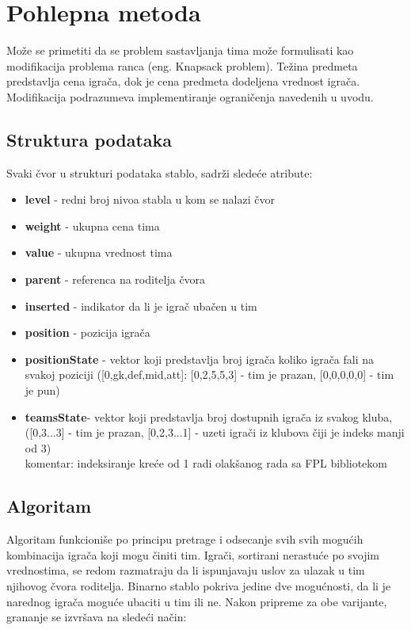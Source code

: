 \documentclass[a4paper]{article}
\begin{document}
\section{Pohlepna metoda}

\vspace{3mm} 
Može se primetiti da se problem sastavljanja tima može formulisati kao modifikacija problema ranca (eng. Knapsack problem). Težina predmeta predstavlja cena igrača, dok je cena predmeta dodeljena vrednost igrača. Modifikacija podrazumeva implementiranje ograničenja navedenih u uvodu.

\subsection{Struktura podataka}
\vspace{3mm} 
Svaki čvor u strukturi podataka stablo, sadrži sledeće atribute: \\
\begin{itemize}
	\item \textbf{level} - redni broj nivoa stabla u kom se nalazi čvor
	\item \textbf{weight} - ukupna cena tima
	\item \textbf{value} - ukupna vrednost tima
	\item \textbf{parent} - referenca na roditelja čvora
	\item \textbf{inserted} - indikator da li je igrač ubačen u tim
	\item \textbf{position} - pozicija igrača
	\item \textbf{positionState} - vektor koji predstavlja broj igrača koliko igrača fali na svakoj poziciji ([0,gk,def,mid,att]: [0,2,5,5,3] - tim je prazan, [0,0,0,0,0] - tim je pun)
	\item \textbf{teamsState}-  vektor koji predstavlja broj dostupnih igrača iz svakog kluba, ([0,3...3] - tim je prazan, [0,2,3...1] - uzeti igrači iz klubova čiji je indeks manji od 3) \\
	
	komentar: indeksiranje kreće od 1 radi olakšanog rada sa FPL bibliotekom

\end{itemize}

\subsection{Algoritam}
\vspace{3mm} 

Algoritam funkcioniše po principu pretrage i odsecanje svih svih mogućih kombinacija igrača koji mogu činiti tim. Igrači, sortirani nerastuće po svojim vrednostima, se redom razmatraju da li ispunjavaju uslov za ulazak u tim njihovog čvora roditelja. Binarno stablo pokriva jedine dve mogućnosti, da li je narednog igrača moguće ubaciti u tim ili ne. Nakon pripreme za obe varijante, grananje se izvršava na sledeći način: 
\end{document}
